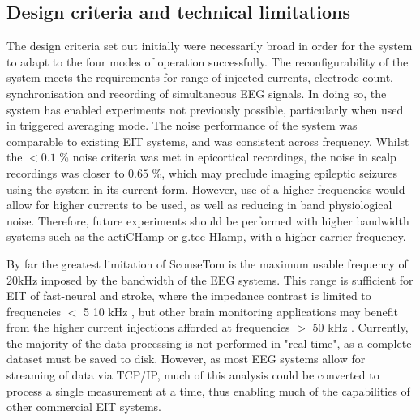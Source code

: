 \subsection{Design criteria and technical limitations}
The design criteria set out initially were necessarily broad in order for the system to adapt to the four modes of operation successfully. The reconfigurability of the system meets the requirements for range of injected currents, electrode count, synchronisation and recording of simultaneous EEG signals. In doing so, the system has enabled experiments not previously possible, particularly when used in triggered averaging mode. The noise performance of the system was comparable to existing EIT systems, and was consistent across frequency. Whilst the  $<0.1$ \% noise criteria was met in epicortical recordings, the noise in scalp recordings was closer to $0.65$ \%, which may preclude imaging epileptic seizures using the system in its current form. However, use of a higher frequencies would allow for higher currents to be used, as well as reducing in band physiological noise. Therefore, future experiments should be performed with higher bandwidth systems such as the actiCHamp or g.tec HIamp, with a higher carrier frequency. 

By far the greatest limitation of ScouseTom is the maximum usable frequency of 20kHz imposed by the bandwidth of the EEG systems. This range is sufficient for EIT of fast-neural and stroke, where the impedance contrast is limited to frequencies $<$ 5 10 kHz \cite{Malone2014a,Aristovich_2016,Vongerichten_2016}, but other brain monitoring applications may benefit from the higher current injections afforded at frequencies $>$ 50 kHz \cite{Fabrizi_2006,fu2014use}. Currently, the majority of the data processing is not performed in "real time", as a complete dataset must be saved to disk. However, as most EEG systems allow for streaming of data via TCP/IP, much of this analysis could be converted to process a single measurement at a time, thus enabling much of the capabilities of other commercial EIT systems.
